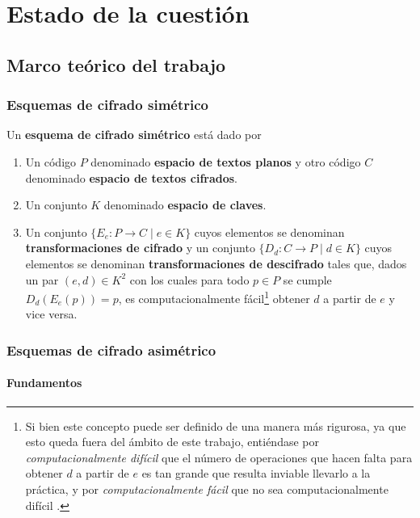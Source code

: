 \chapter{Estado de la cuestión}  

\section{Marco teórico del trabajo}

\subsection{Esquemas de cifrado simétrico}

\begin{definition}
	Un \textbf{esquema de cifrado simétrico} está dado por
	\begin{enumerate}
		\item Un código $P$ denominado \textbf{espacio de textos planos} y otro código $C$ denominado \textbf{espacio de textos cifrados}.
		\item Un conjunto $K$ denominado \textbf{espacio de claves}.
		\item Un conjunto $\{E_e : P \rightarrow C \mid e \in K\}$ cuyos elementos se denominan \textbf{transformaciones de cifrado} y un conjunto $\{D_d : C \rightarrow P \mid d \in K\}$ cuyos elementos se denominan \textbf{transformaciones de descifrado} tales que, dados un par $(e, d) \in K^2$ con los cuales para todo $p \in P$ se cumple $D_d(E_e(p)) = p$, es computacionalmente fácil\footnote{Si bien este concepto puede ser definido de una manera más rigurosa, ya que esto queda fuera del ámbito de este trabajo, entiéndase por \textit{computacionalmente difícil} que el número de operaciones que hacen falta para obtener $d$ a partir de $e$ es tan grande que resulta inviable llevarlo a la práctica, y por \textit{computacionalmente fácil} que no sea computacionalmente difícil \autocite{Pellikaan_Wu_Bulygin_Jurrius_2017}.} obtener $d$ a partir de $e$ y vice versa.
	\end{enumerate}
\end{definition}

\subsection{Esquemas de cifrado asimétrico}

\subsubsection{Fundamentos}

